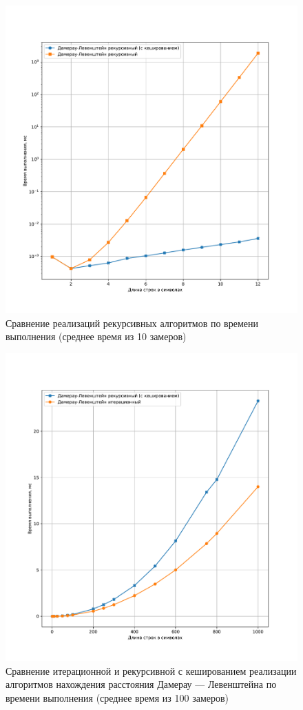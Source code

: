 \begin{figure}[H]
	\centering
	\includegraphics[width=\textwidth]{img/fn_rec.pdf}
	\caption{Сравнение реализаций рекурсивных алгоритмов по времени выполнения (среднее время из 10 замеров)}
	\label{fig:fn_rec}
\end{figure}

\begin{figure}[H]
	\centering
	\includegraphics[width=\textwidth]{img/fn_damlev_iter_rec.pdf}
	\caption{Сравнение итерационной и рекурсивной с кешированием реализации алгоритмов нахождения расстояния Дамерау --- Левенштейна по времени выполнения (среднее время из 100 замеров)}
	\label{fig:fn_dlir}
\end{figure}


